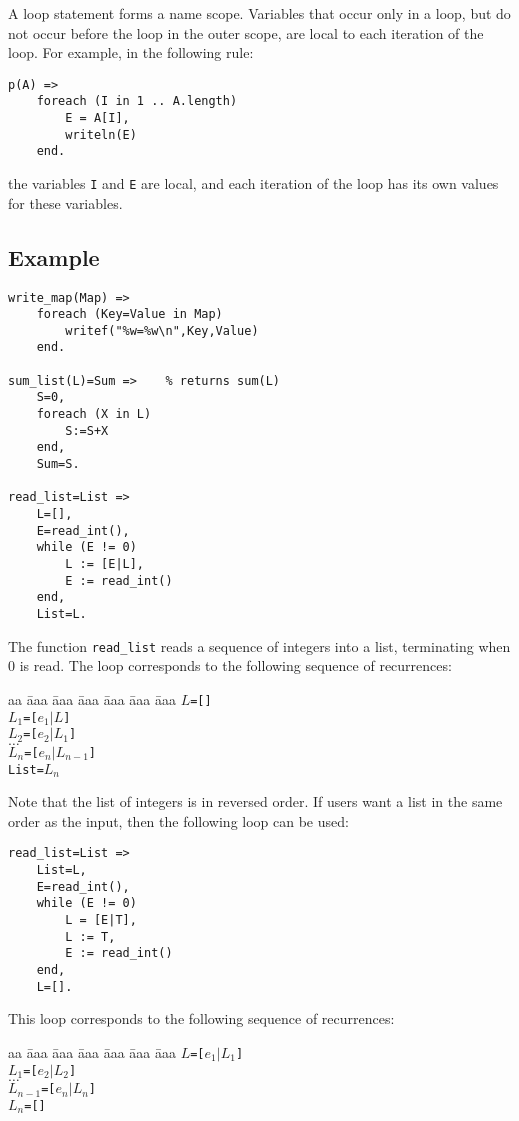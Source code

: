 A loop statement forms a name scope. Variables that occur only in a loop, but do not occur before the loop in the outer scope, are local to each iteration of the loop. For example, in the following rule:
\begin{verbatim}
p(A) =>
    foreach (I in 1 .. A.length)
        E = A[I],
        writeln(E)
    end.
\end{verbatim}
the variables \texttt{I} and \texttt{E} are local, and each iteration of the loop has its own values for these variables.

\subsection*{Example}
\begin{verbatim}
write_map(Map) =>
    foreach (Key=Value in Map)
        writef("%w=%w\n",Key,Value)
    end.

sum_list(L)=Sum =>    % returns sum(L)
    S=0,
    foreach (X in L)
        S:=S+X
    end,
    Sum=S.

read_list=List =>
    L=[],
    E=read_int(),
    while (E != 0) 
        L := [E|L],
        E := read_int()
    end,
    List=L.
\end{verbatim}
The function \texttt{read\_list} reads a sequence of integers into a list, terminating when 0 is read. The loop corresponds to the following sequence of recurrences:
\begin{tabbing}
aa \= aaa \= aaa \= aaa \= aaa \= aaa \= aaa \kill
\> \texttt{$L$=[]} \\
\> \texttt{$L_1$=[$e_1$$|$$L$]} \\
\> \texttt{$L_2$=[$e_2$$|$$L_1$]} \\
\> $\ldots$ \\
\> \texttt{$L_n$=[$e_n$$|$$L_{n-1}$]} \\
\> \texttt{List=$L_n$}
\end{tabbing}
Note that the list of integers is in reversed order. If users want a list in the same order as the input, then the following loop can be used:
\begin{verbatim}
read_list=List =>
    List=L,
    E=read_int(),
    while (E != 0) 
        L = [E|T],
        L := T,
        E := read_int()
    end,
    L=[].
\end{verbatim}
This loop corresponds to the following sequence of recurrences:
\begin{tabbing}
aa \= aaa \= aaa \= aaa \= aaa \= aaa \= aaa \kill
\> \texttt{$L$=[$e_1$$|$$L_1$]} \\
\> \texttt{$L_1$=[$e_2$$|$$L_2$]} \\
\> $\ldots$ \\
\> \texttt{$L_{n-1}$=[$e_n$$|$$L_{n}$]} \\
\> \texttt{$L_n$=[]}
\end{tabbing}
